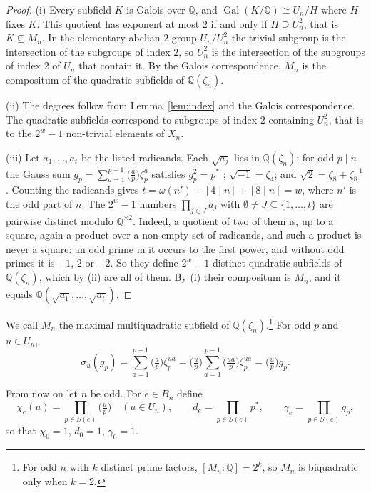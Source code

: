 \documentclass[11pt]{article}
\theoremstyle{definition}
\newcommand{\Q}{\mathbb{Q}}
\newcommand{\Gal}{\operatorname{Gal}}
\newcommand{\leg}[2]{\bigl(\tfrac{#1}{#2}\bigr)}
\begin{document}
\begin{proof}
(i) Every subfield $K$ is Galois over $\Q$, and $\Gal(K/\Q)\cong U_n/H$ where $H$ fixes $K$. This quotient has exponent at most $2$ if and only if $H\supseteq U_n^2$, that is $K\subseteq M_n$. In the elementary abelian $2$-group $U_n/U_n^2$ the trivial subgroup is the intersection of the subgroups of index $2$, so $U_n^2$ is the intersection of the subgroups of index $2$ of $U_n$ that contain it. By the Galois correspondence, $M_n$ is the compositum of the quadratic subfields of $\Q(\zeta_n)$.

(ii) The degrees follow from Lemma~\ref{lem:index} and the Galois correspondence. The quadratic subfields correspond to subgroups of index $2$ containing $U_n^2$, that is to the $2^w-1$ non-trivial elements of $X_n$.

(iii) Let $a_1,\dots,a_t$ be the listed radicands. Each $\sqrt{a_j}$ lies in $\Q(\zeta_n)$: for odd $p\mid n$ the Gauss sum $g_p=\sum_{a=1}^{p-1}\leg{a}{p}\zeta_p^{a}$ satisfies $g_p^2=p^*$ \cite[Proposition~6.3.2]{IR}; $\sqrt{-1}=\zeta_4$; and $\sqrt2=\zeta_8+\zeta_8^{-1}$. Counting the radicands gives $t=\omega(n')+[4\mid n]+[8\mid n]=w$, where $n'$ is the odd part of $n$. The $2^w-1$ numbers $\prod_{j\in J}a_j$ with $\emptyset\ne J\subseteq\{1,\dots,t\}$ are pairwise distinct modulo $\Q^{\times2}$. Indeed, a quotient of two of them is, up to a square, again a product over a non-empty set of radicands, and such a product is never a square: an odd prime in it occurs to the first power, and without odd primes it is $-1$, $2$ or $-2$. So they define $2^w-1$ distinct quadratic subfields of $\Q(\zeta_n)$, which by (ii) are all of them. By (i) their compositum is $M_n$, and it equals $\Q(\sqrt{a_1},\dots,\sqrt{a_t})$.
\end{proof}

We call $M_n$ the maximal multiquadratic subfield of $\Q(\zeta_n)$.\footnote{For odd $n$ with $k$ distinct prime factors, $[M_n:\Q]=2^k$, so $M_n$ is biquadratic only when $k=2$.} For odd $p$ and $u\in U_n$,
\begin{equation}\label{eq:gauss-action}
  \sigma_u(g_p)=\sum_{a=1}^{p-1}\leg{a}{p}\zeta_p^{ua}=\leg{u}{p}\sum_{a=1}^{p-1}\leg{ua}{p}\zeta_p^{ua}=\leg{u}{p}g_p .
\end{equation}

From now on let $n$ be odd. For $e\in B_n$ define
\[
  \chi_e(u)=\prod_{p\in S(e)}\leg{u}{p}\quad(u\in U_n),\qquad d_e=\prod_{p\in S(e)}p^*,\qquad \gamma_e=\prod_{p\in S(e)}g_p ,
\]
so that $\chi_0=1$, $d_0=1$, $\gamma_0=1$.
\end{document}
